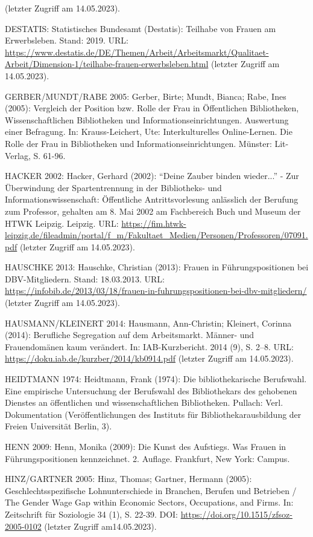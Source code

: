 \documentclass[a4paper,
fontsize=11pt,
oneside,
numbers=noperiodatend,
parskip=half-,
bibliography=totoc,
final
]{scrartcl}
\begin{document}
(letzter Zugriff am 14.05.2023).

DESTATIS: Statistisches Bundesamt (Destatis): Teilhabe von Frauen am
Erwerbsleben. Stand: 2019. URL:
\url{https://www.destatis.de/DE/Themen/Arbeit/Arbeitsmarkt/Qualitaet-Arbeit/Dimension-1/teilhabe-frauen-erwerbsleben.html}
(letzter Zugriff am 14.05.2023).

GERBER/MUNDT/RABE 2005: Gerber, Birte; Mundt, Bianca; Rabe, Ines (2005):
Vergleich der Position bzw. Rolle der Frau in Öffentlichen Bibliotheken,
Wissenschaftlichen Bibliotheken und Informationseinrichtungen.
Auswertung einer Befragung. In: Krauss-Leichert, Ute: Interkulturelles
Online-Lernen. Die Rolle der Frau in Bibliotheken und
Informationseinrichtungen. Münster: Lit-Verlag, S. 61-96.

HACKER 2002: Hacker, Gerhard (2002): \enquote{Deine Zauber binden
wieder...} - Zur Überwindung der Spartentrennung in der Bibliotheks- und
Informationswissenschaft: Öffentliche Antrittsvorlesung anlässlich der
Berufung zum Professor, gehalten am 8. Mai 2002 am Fachbereich Buch und
Museum der HTWK Leipzig. Leipzig. URL:
\url{https://fim.htwk-leipzig.de/fileadmin/portal/f_m/Fakultaet_Medien/Personen/Professoren/07091.pdf}
(letzter Zugriff am 14.05.2023).

HAUSCHKE 2013: Hauschke, Christian (2013): Frauen in Führungspositionen
bei DBV-Mitgliedern. Stand: 18.03.2013. URL:
\url{https://infobib.de/2013/03/18/frauen-in-fuhrungspositionen-bei-dbv-mitgliedern/}
(letzter Zugriff am 14.05.2023).

HAUSMANN/KLEINERT 2014: Hausmann, Ann-Christin; Kleinert, Corinna
(2014): Berufliche Segregation auf dem Arbeitsmarkt. Männer- und
Frauendomänen kaum verändert. In: IAB-Kurzbericht. 2014 (9), S. 2--8.
URL: \url{https://doku.iab.de/kurzber/2014/kb0914.pdf} (letzter Zugriff
am 14.05.2023).

HEIDTMANN 1974: Heidtmann, Frank (1974): Die bibliothekarische
Berufswahl. Eine empirische Untersuchung der Berufswahl des
Bibliothekars des gehobenen Dienstes an öffentlichen und
wissenschaftlichen Bibliotheken. Pullach: Verl. Dokumentation
(Veröffentlichungen des Instituts für Bibliothekarausbildung der Freien
Universität Berlin, 3).

HENN 2009: Henn, Monika (2009): Die Kunst des Aufstiegs. Was Frauen in
Führungspositionen kennzeichnet. 2. Auflage. Frankfurt, New York:
Campus.

HINZ/GARTNER 2005: Hinz, Thomas; Gartner, Hermann (2005):
Geschlechtsspezifische Lohnunterschiede in Branchen, Berufen und
Betrieben / The Gender Wage Gap within Economic Sectors, Occupations,
and Firms. In: Zeitschrift für Soziologie 34 (1), S. 22-39. DOI:
\url{https://doi.org/10.1515/zfsoz-2005-0102} (letzter Zugriff
am14.05.2023).
\end{document}
